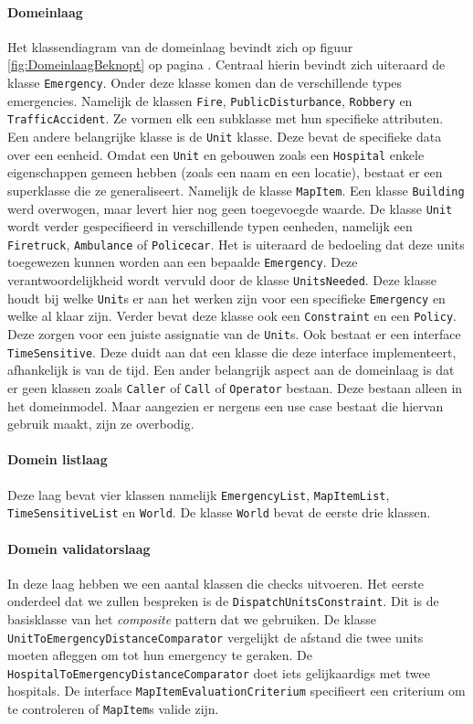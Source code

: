 \paragraph{Domeinlaag}
 Het klassendiagram van de domeinlaag bevindt zich op figuur \ref{fig:DomeinlaagBeknopt} op pagina \pageref{fig:DomeinlaagBeknopt}. Centraal hierin bevindt zich uiteraard de klasse \texttt{Emergency}. Onder deze klasse komen dan de verschillende types emergencies. Namelijk de klassen \texttt{Fire}, \texttt{PublicDisturbance}, \texttt{Robbery} en \texttt{TrafficAccident}. Ze vormen elk een subklasse met hun specifieke attributen. Een andere belangrijke klasse is de \texttt{Unit} klasse. Deze bevat de specifieke data over een eenheid. Omdat een \texttt{Unit} en gebouwen zoals een \texttt{Hospital} enkele eigenschappen gemeen hebben (zoals een naam en een locatie), bestaat er een superklasse die ze generaliseert. Namelijk de klasse \texttt{MapItem}. Een klasse \texttt{Building} werd overwogen, maar levert hier nog geen toegevoegde waarde. De klasse \texttt{Unit} wordt verder gespecifieerd in verschillende typen eenheden, namelijk een \texttt{Firetruck}, \texttt{Ambulance} of \texttt{Policecar}. Het is uiteraard de bedoeling dat deze units toegewezen kunnen worden aan een bepaalde \texttt{Emergency}. Deze verantwoordelijkheid wordt vervuld door de klasse \texttt{UnitsNeeded}. Deze klasse houdt bij welke \texttt{Unit}s  er aan het werken zijn voor een specifieke \texttt{Emergency} en welke al klaar zijn. Verder bevat deze klasse ook een \texttt{Constraint} en een \texttt{Policy}. Deze zorgen voor een juiste assignatie van de \texttt{Unit}s. Ook bestaat er een interface \texttt{TimeSensitive}. Deze duidt aan dat een klasse die deze interface implementeert, afhankelijk is van de tijd. Een ander belangrijk aspect aan de domeinlaag is dat er geen klassen zoals \texttt{Caller} of \texttt{Call} of \texttt{Operator} bestaan. Deze bestaan alleen in het domeinmodel. Maar aangezien er nergens een use case bestaat die hiervan gebruik maakt, zijn ze overbodig.
\paragraph{Domein listlaag}
Deze laag bevat vier klassen namelijk \texttt{EmergencyList}, \texttt{MapItemList}, \texttt{TimeSensitiveList} en \texttt{World}. De klasse \texttt{World} bevat de eerste drie klassen.
\paragraph{Domein validatorslaag}
In deze laag hebben we een aantal klassen die checks uitvoeren. Het eerste onderdeel dat we zullen bespreken is de \texttt{DispatchUnitsConstraint}. Dit is de basisklasse van het \textit{composite} pattern dat we gebruiken. De klasse \texttt{UnitToEmergencyDistanceComparator} vergelijkt de afstand die twee units moeten afleggen om tot hun emergency te geraken. De \texttt{HospitalToEmergencyDistanceComparator} doet iets gelijkaardigs met twee hospitals. De interface \texttt{MapItemEvaluationCriterium} specifieert een criterium om te controleren of \texttt{MapItem}s valide zijn.
